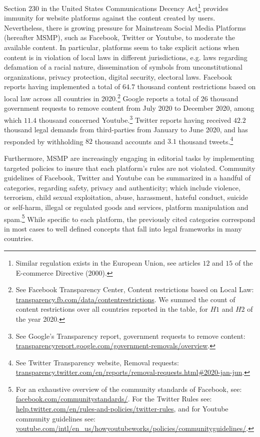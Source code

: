 \documentclass{article}
\begin{document}
Section $230$ in the United States Communications Decency Act\footnote{Similar regulation exists in the European Union, see articles $12$ and $15$ of the E-commerce Directive (2000). } provides immunity for website platforms against the content created by users. Nevertheless, there is growing pressure for Mainstream Social Media Platforms (hereafter MSMP), such as Facebook, Twitter or Youtube, to moderate the available content. In particular, platforms seem to take explicit actions when content is in violation of local laws in different jurisdictions, e.g. laws regarding defamation of a racial nature, dissemination of symbols from unconstitutional organizations, privacy protection, digital security, electoral laws. Facebook reports having implemented a total of $64.7$ thousand content restrictions based on local law across all countries in 2020.\footnote{See Facebook Transparency Center, Content restrictions based on Local Law: \href{https://transparency.fb.com/data/content\-restrictions}{transparency.fb.com/data/content\-restrictions}. We summed the count of content restrictions over all countries reported in the table, for $H1$ and $H2$ of the year 2020.} Google reports a total of $26$ thousand government requests to remove content from July 2020 to December 2020, among which $11.4$ thousand concerned Youtube.\footnote{See Google's Transparency report, government requests to remove content: \href{https://transparencyreport.google.com/government-removals/overview}{transparencyreport.google.com/government-removals/overview}.} Twitter reports having received $42.2$ thousand legal demands from third-parties from January to June 2020, and has responded by withholding $82$ thousand accounts and $3.1$ thousand tweets.\footnote{See Twitter Transparency website, Removal requests: \href{https://transparency.twitter.com/en/reports/removal-requests.html\#2020-jan-jun}{transparency.twitter.com/en/reports/removal-requests.html\#2020-jan-jun}.} 

\smallskip

Furthermore, MSMP are increasingly engaging in editorial tasks by implementing targeted policies to insure that each platform's rules are not violated. Community guidelines of Facebook, Twitter and Youtube can be summarized in a handful of categories, regarding safety, privacy and authenticity; which include violence, terrorism, child sexual exploitation, abuse, harassment, hateful conduct, suicide or self-harm, illegal or regulated goods and services, platform manipulation and spam.\footnote{For an exhaustive overview of the community standards of Facebook, see: \href{https://www.facebook.com/communitystandards/}{facebook.com/communitystandards/}. For the Twitter  Rules see: \href{https://help.twitter.com/en/rules-and-policies/twitter-rules}{help.twitter.com/en/rules-and-policies/twitter-rules}, and for Youtube community guidelines see: \href{https://www.youtube.com/intl/en\_us/howyoutubeworks/policies/community\-guidelines/}{youtube.com/intl/en\_us/howyoutubeworks/policies/community\-guidelines/}.} While specific to each platform, the previously cited categories correspond in most cases to well defined concepts that fall into legal frameworks in many countries. 
\end{document}
